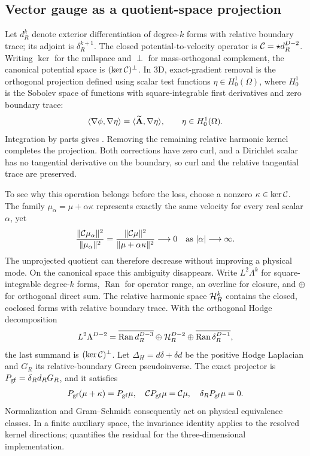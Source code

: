 \subsection{Vector gauge as a quotient-space projection}
\label{app:vector-gauge}
Let $d_R^k$ denote exterior differentiation of degree-$k$ forms with relative boundary trace; its adjoint is $\delta_R^{k+1}$. The closed potential-to-velocity operator is $\mathcal C=\star d_R^{D-2}$. Writing $\ker$ for the nullspace and $\perp$ for mass-orthogonal complement, the canonical potential space is $(\ker\mathcal C)^\perp$. In 3D, exact-gradient removal is the orthogonal projection defined using scalar test functions $\eta\in H_0^1(\Omega)$, where $H_0^1$ is the Sobolev space of functions with square-integrable first derivatives and zero boundary trace:
\[
\langle \nabla\phi,\nabla\eta\rangle=\langle \widetilde{\mathbf A},\nabla\eta\rangle,\qquad \eta\in H_0^1(\Omega).
\]
Integration by parts gives . Removing the remaining relative harmonic kernel completes the projection. Both corrections have zero curl, and a Dirichlet scalar has no tangential derivative on the boundary, so curl and the relative tangential trace are preserved.

To see why this operation belongs before the loss, choose a nonzero $\kappa\in\ker\mathcal C$. The family $\mu_\alpha=\mu+\alpha\kappa$ represents exactly the same velocity for every real scalar $\alpha$, yet
\begin{equation}
\frac{\lVert \mathcal C\mu_\alpha\rVert^2}{\lVert \mu_\alpha\rVert^2}
=\frac{\lVert \mathcal C\mu\rVert^2}{\lVert \mu+\alpha\kappa\rVert^2}\longrightarrow0
\quad\text{as }|\alpha|\longrightarrow\infty.
\end{equation}
The unprojected quotient can therefore decrease without improving a physical mode. On the canonical space this ambiguity disappears. Write $L^2\Lambda^k$ for square-integrable degree-$k$ forms, $\operatorname{Ran}$ for operator range, an overline for closure, and $\oplus$ for orthogonal direct sum. The relative harmonic space $\mathcal H_R^k$ contains the closed, coclosed forms with relative boundary trace. With the orthogonal Hodge decomposition {\citep{arnold2006finite}}
\begin{equation}
L^2\Lambda^{D-2}=\overline{\operatorname{Ran}d_R^{D-3}}
\oplus\mathcal H_R^{D-2}\oplus\overline{\operatorname{Ran}\delta_R^{D-1}},
\end{equation}
the last summand is $(\ker\mathcal C)^\perp$. Let $\Delta_H=d\delta+\delta d$ be the positive Hodge Laplacian and $G_R$ its relative-boundary Green pseudoinverse. The exact projector is $P_{\rm gf}=\delta_R d_R G_R$, and it satisfies
\begin{equation}
P_{\rm gf}(\mu+\kappa)=P_{\rm gf}\mu,\quad
\mathcal C P_{\rm gf}\mu=\mathcal C\mu,\quad
\delta_R P_{\rm gf}\mu=0.
\end{equation}
Normalization and Gram--Schmidt consequently act on physical equivalence classes. In a finite auxiliary space, the invariance identity applies to the resolved kernel directions;  quantifies the residual for the three-dimensional implementation.


